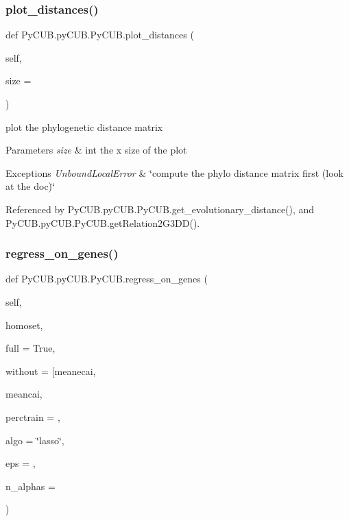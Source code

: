 \subsubsection{\texorpdfstring{plot\+\_\+distances()}{plot\_distances()}}
{\footnotesize\ttfamily def Py\+C\+U\+B.\+py\+C\+U\+B.\+Py\+C\+U\+B.\+plot\+\_\+distances (\begin{DoxyParamCaption}\item[{}]{self,  }\item[{}]{size = {} }\end{DoxyParamCaption})}



plot the phylogenetic distance matrix 


\begin{DoxyParams}{Parameters}
{\em size} & int the x size of the plot\\
\hline
\end{DoxyParams}

\begin{DoxyExceptions}{Exceptions}
{\em Unbound\+Local\+Error} & \char`\"{}compute the phylo distance matrix first (look at the doc)\char`\"{} \\
\hline
\end{DoxyExceptions}


Referenced by Py\+C\+U\+B.\+py\+C\+U\+B.\+Py\+C\+U\+B.\+get\+\_\+evolutionary\+\_\+distance(), and Py\+C\+U\+B.\+py\+C\+U\+B.\+Py\+C\+U\+B.\+get\+Relation2\+G3\+D\+D().

\mbox{\label{class_py_c_u_b_1_1py_c_u_b_1_1_py_c_u_b_a1b65efe7deb4ba5f65203c8be6fc7af2}} 
\subsubsection{\texorpdfstring{regress\+\_\+on\+\_\+genes()}{regress\_on\_genes()}}
{\footnotesize\ttfamily def Py\+C\+U\+B.\+py\+C\+U\+B.\+Py\+C\+U\+B.\+regress\+\_\+on\+\_\+genes (\begin{DoxyParamCaption}\item[{}]{self,  }\item[{}]{homoset,  }\item[{}]{full = {\ttfamily True},  }\item[{}]{without = {\ttfamily \mbox{[}\textquotesingle{}meanecai\textquotesingle{}},  }\item[{}]{meancai,  }\item[{}]{perctrain = {},  }\item[{}]{algo = {\ttfamily \char`\"{}lasso\char`\"{}},  }\item[{}]{eps = {},  }\item[{}]{n\+\_\+alphas = {} }\end{DoxyParamCaption})}



